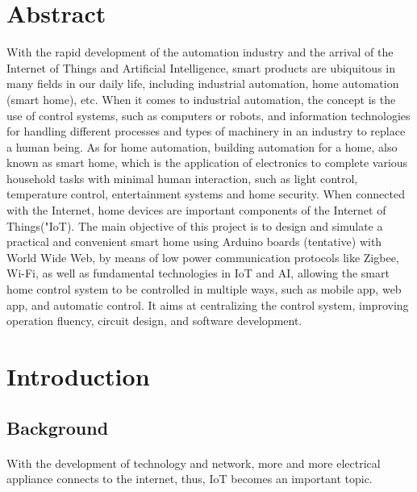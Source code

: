\documentclass[a4paper,12pt]{article}
\begin{document}
\newpage

\setlength{\leftskip}{0cm} \section*{Abstract}
With the rapid development of the automation industry and the arrival of the Internet of Things and Artificial Intelligence, smart products are ubiquitous in many fields in our daily life, including industrial automation, home automation (smart home), etc. When it comes to industrial automation, the concept is the use of control systems, such as computers or robots, and information technologies for handling different processes and types of machinery in an industry to replace a human being. As for home automation, building automation for a home, also known as smart home, which is the application of electronics to complete various household tasks with minimal human interaction, such as light control, temperature control, entertainment systems and home security. When connected with the Internet, home devices are important components of the Internet of Things("IoT). The main objective of this project is to design and simulate a practical and convenient smart home using Arduino boards (tentative) with World Wide Web, by means of low power communication protocols like Zigbee, Wi-Fi, as well as fundamental technologies in IoT and AI, allowing the smart home control system to be controlled in multiple ways, such as mobile app, web app, and automatic control. It aims at centralizing the control system, improving operation fluency, circuit design, and software development.


\newpage
\doublespacing
\renewcommand{\contentsname}{Table of Contents}
\tableofcontents
{}
\singlespacing


\newpage
\section{Introduction}
\subsection{Background}
\paragraph{}
With the development of technology and network, more and more electrical appliance connects to the internet, thus, IoT becomes an important topic. \\\par
\end{document}
